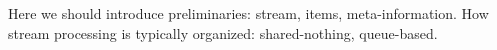 
\label {fs-stream}

Here we should introduce preliminaries: stream, items, meta-information. How stream processing is typically organized: shared-nothing, queue-based.